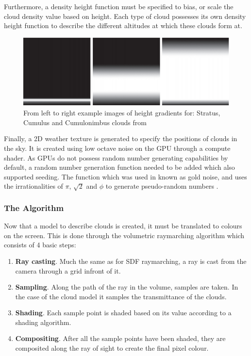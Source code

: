 \documentclass[10pt, openany]{book}
\begin{document}
Furthermore, a density height function must be specified to bias, or scale the cloud density value based on height. Each type of cloud possesses its own density height function to describe the different altitudes at which these clouds form at. \citep{gpupro7}

\begin{figure}[H]
	\centering
	\includegraphics[width=.6\linewidth]{height-functions}
	\caption{From left to right example images of height gradients for: Stratus, Cumulus and Cumulonimbus clouds from \citep{gpupro7}}
\end{figure}

Finally, a 2D weather texture is generated to specify the positions of clouds in the sky. It is created using low octave noise on the GPU through a compute shader. As GPUs do not possess random number generating capabilities by default, a random number generation function needed to be added which also supported seeding. The function which was used in known as gold noise, and uses the irrationalities of $\pi$, $\sqrt{2}$ and $\phi$ to generate pseudo-random numbers \citep{goldnoise}. 

\subsubsection{The Algorithm}

Now that a model to describe clouds is created, it must be translated to colours on the screen. This is done through the volumetric raymarching algorithm which consists of 4 basic steps:
\begin{enumerate}
	\item \textbf{Ray casting}. Much the same as for SDF raymarching, a ray is cast from the camera through a grid infront of it.
	\item \textbf{Sampling}. Along the path of the ray in the volume, samples are taken. In the case of the cloud model it samples the transmittance of the clouds.
	\item \textbf{Shading}. Each sample point is shaded based on its value according to a shading algorithm.
	\item \textbf{Compositing}. After all the sample points have been shaded, they are composited along the ray of sight to create the final pixel colour.
\end{enumerate}
\end{document}

